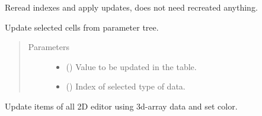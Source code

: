 \documentclass[a4paper,10pt,english]{sphinxmanual}
\begin{document}
\begin{fulllineitems}
\begin{fulllineitems}
\end{fulllineitems}


\begin{fulllineitems}
\label{\detokenize{autodoc/mrsprint/mrsprint:mrsprint.mainwindow.MainWindow.updateObserverIndex}}
Reread indexes and apply updates, does not need recreated anything.

\end{fulllineitems}


\begin{fulllineitems}
\label{\detokenize{autodoc/mrsprint/mrsprint:mrsprint.mainwindow.MainWindow.updateSelectedCells}}
Update selected cells from parameter tree.
\begin{quote}\begin{description}
\item[{Parameters}] \leavevmode\begin{itemize}
\item {} 
 () \textendash{} Value to be updated in the table.

\item {} 
 () \textendash{} Index of selected type of data.

\end{itemize}

\end{description}\end{quote}

\end{fulllineitems}


\begin{fulllineitems}
\label{\detokenize{autodoc/mrsprint/mrsprint:mrsprint.mainwindow.MainWindow.updateTableFromData2DEditor}}
Update items of all 2D editor using 3d-array data and set color.


\end{fulllineitems}
\end{fulllineitems}
\end{document}
